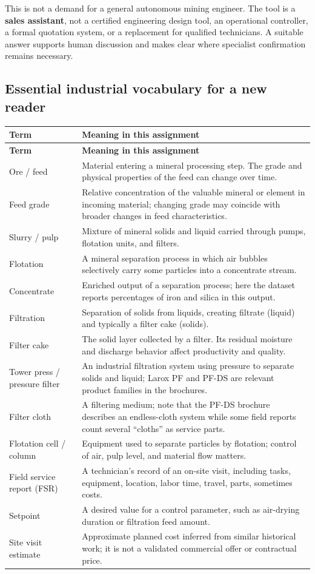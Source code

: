 \documentclass[11pt,a4paper]{article}
\newcommand{\term}[1]{\textbf{#1}}
\begin{document}
This is not a demand for a general autonomous mining engineer. The tool is a \term{sales assistant}, not a certified engineering design tool, an operational controller, a formal quotation system, or a replacement for qualified technicians. A suitable answer supports human discussion and makes clear where specialist confirmation remains necessary.

\subsection{Essential industrial vocabulary for a new reader}
\begin{longtable}{@{}L{34mm}L{113mm}@{}}
\toprule
\textbf{Term} & \textbf{Meaning in this assignment}\\\midrule\endfirsthead
\toprule\textbf{Term} & \textbf{Meaning in this assignment}\\\midrule\endhead
Ore / feed & Material entering a mineral processing step. The grade and physical properties of the feed can change over time.\\
Feed grade & Relative concentration of the valuable mineral or element in incoming material; changing grade may coincide with broader changes in feed characteristics.\\
Slurry / pulp & Mixture of mineral solids and liquid carried through pumps, flotation units, and filters.\\
Flotation & A mineral separation process in which air bubbles selectively carry some particles into a concentrate stream.\\
Concentrate & Enriched output of a separation process; here the dataset reports percentages of iron and silica in this output.\\
Filtration & Separation of solids from liquids, creating filtrate (liquid) and typically a filter cake (solids).\\
Filter cake & The solid layer collected by a filter. Its residual moisture and discharge behavior affect productivity and quality.\\
Tower press / pressure filter & An industrial filtration system using pressure to separate solids and liquid; Larox PF and PF-DS are relevant product families in the brochures.\\
Filter cloth & A filtering medium; note that the PF-DS brochure describes an endless-cloth system while some field reports count several ``cloths'' as service parts.\\
Flotation cell / column & Equipment used to separate particles by flotation; control of air, pulp level, and material flow matters.\\
Field service report (FSR) & A technician's record of an on-site visit, including tasks, equipment, location, labor time, travel, parts, sometimes costs.\\
Setpoint & A desired value for a control parameter, such as air-drying duration or filtration feed amount.\\
Site visit estimate & Approximate planned cost inferred from similar historical work; it is not a validated commercial offer or contractual price.\\
\bottomrule
\end{longtable}
\end{document}
